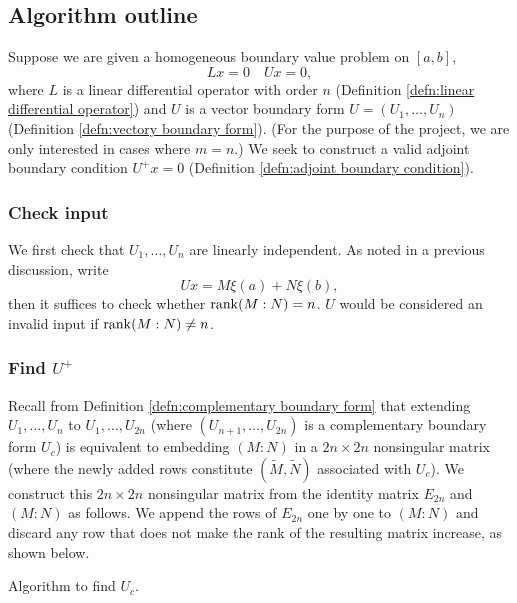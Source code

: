 \documentclass[11pt, oneside, a4paper]{article}
\begin{document}
\subsection{Algorithm outline}
Suppose we are given a homogeneous boundary value problem on $[a,b]$,
\[Lx=0\quad Ux=0,\]
where $L$ is a linear differential operator with order $n$ (Definition \ref{defn:linear differential operator}) and $U$ is a vector boundary form $U=(U_1,\ldots, U_n)$ (Definition \ref{defn:vectory boundary form}). (For the purpose of the project, we are only interested in cases where $m=n$.) We seek to construct a valid adjoint boundary condition $U^+x=0$ (Definition \ref{defn:adjoint boundary condition}). 

\subsubsection{Check input}
We first check that $U_1,\ldots, U_n$ are linearly independent. As noted in a previous discussion, write
\[Ux = M\xi(a) + N\xi(b),\]
then it suffices to check whether $\operatorname{rank}(M:N)=n$. $U$ would be considered an invalid input if $\operatorname{rank}(M:N)\neq n$.

\subsubsection{Find $U^+$}
Recall from Definition \ref{defn:complementary boundary form} that extending $U_1,\ldots,U_n$ to $U_1,\ldots,U_{2n}$ (where $(U_{n+1},\ldots, U_{2n})$ is a complementary boundary form $U_c$) is equivalent to embedding $(M:N)$ in a $2n\times 2n$ nonsingular matrix (where the newly added rows constitute $(\tilde{M}, \tilde{N})$ associated with $U_c$). We construct this $2n\times 2n$ nonsingular matrix from the identity matrix $E_{2n}$ and $(M:N)$ as follows. We append the rows of $E_{2n}$ one by one to $(M:N)$ and discard any row that does not make the rank of the resulting matrix increase, as shown below.

\begin{algorithm}[H]
    \caption{Algorithm to find $U_c$.}\label{algo:Find $U_c$.}
\end{algorithm}
\end{document}
